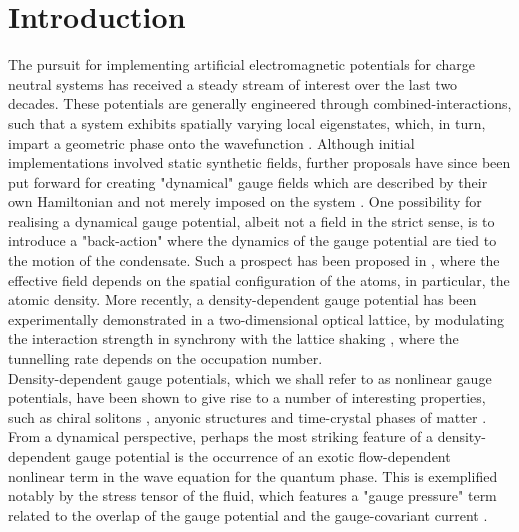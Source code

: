 \documentclass[twocolumn, nofootinbib, nobibnotes, amsmath,amssymb,aps, pra, floatfix]{revtex4-1}
\begin{document}
\section{Introduction}
The pursuit for implementing artificial electromagnetic potentials for charge neutral systems has received a steady stream of interest over the last two decades.
These potentials are generally engineered through combined-interactions, such that a system exhibits spatially varying local eigenstates, which, in turn, impart a geometric phase onto the wavefunction \cite{dalibard2011colloquium,goldman2014light,berry1984quantal,peskin1989aharonov}.
Although initial implementations involved static synthetic fields, further proposals have since been put forward for creating "dynamical" gauge fields which are described by their own Hamiltonian and not merely imposed on the system \cite{kapit2011optical,wiese2013ultracold,banerjee2012atomic,tagliacozzo2013simulation,zohar2013cold,tagliacozzo2013optical}.
One possibility for realising a dynamical gauge potential, albeit not a field in the strict sense, is to introduce a "back-action" where the dynamics of the gauge potential are tied to the motion of the condensate.
Such a prospect has been proposed in \cite{edmonds2013,edmonds2013josephson,keilmann2011statistically,greschner2014density,cardarelli2016engineering,PhysRevLett.115.053002,PhysRevLett.117.205303}, where the effective field depends on the spatial configuration of the atoms, in particular, the atomic density.
More recently, a density-dependent gauge potential has been experimentally demonstrated in a two-dimensional optical lattice, by modulating the interaction strength in synchrony with the lattice shaking \cite{PhysRevLett.121.030402}, where the tunnelling rate depends on the occupation number.\\
Density-dependent gauge potentials, which we shall refer to as nonlinear gauge potentials, have been shown to give rise to a number of interesting properties, such as chiral solitons \cite{edmonds2013,dingwall2018non,dingwall2019stability}, anyonic structures \cite{aglietti1996anyons} and time-crystal phases of matter \cite{ohberg2019quantum}.
From a dynamical perspective, perhaps the most striking feature of a density-dependent gauge potential is the occurrence of an exotic flow-dependent nonlinear term in the wave equation for the quantum phase.
This is exemplified notably by the stress tensor of the fluid, which features a "gauge pressure" term related to the overlap of the gauge potential and the gauge-covariant current \cite{buggy2020hydrodynamics}.
\end{document}
